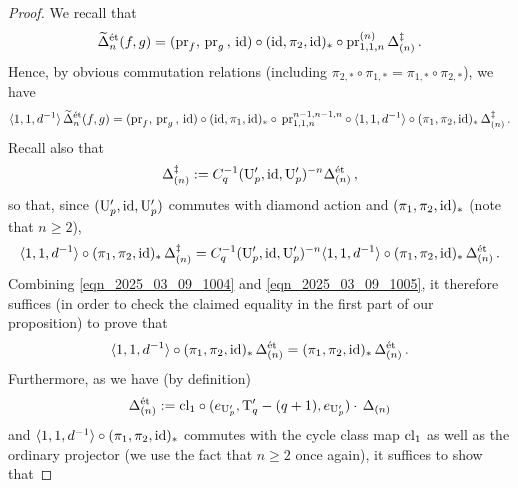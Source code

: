 \documentclass{amsart}
\numberwithin{equation}{section}
\newcommand{\etale}{\textup{\'et}}
\begin{document}
\begin{proof}
    We recall that 
$$\widetilde{\Delta}_{n}^{\etale}(f,g)=({\rm pr}_f,\,{\rm pr}_g\,,\,{\rm id})\circ ({\rm id},\pi_2,{\rm id})_*\circ {\rm pr}^{(n)}_{1,1,n}  \,\Delta_{(n)}^{\ddagger}\,.$$
Hence, by obvious commutation relations (including $\pi_{2,*}\circ \pi_{1,*}=\pi_{1,*}\circ\pi_{2,*}$), we have
\begin{align}
\label{eqn_2025_03_09_1004}
\begin{aligned}
    \langle 1,1,d^{-1}\rangle\,\widetilde{\Delta}_{n}^{\etale}(f,g) =({\rm pr}_f,\,{\rm pr}_g\,,\,{\rm id})\circ ({\rm id},\pi_1,{\rm id})_*\circ \,{\rm pr}^{n-1,n-1,n}_{1,1,n}\circ \langle 1,1,d^{-1}\rangle \circ (\pi_1,\pi_2,{\rm id})_*\,\Delta_{(n)}^{\ddagger}\,.
\end{aligned}
\end{align}
Recall also that 
$$\Delta_{(n)}^{\ddagger}:=C_q^{-1}(\mathrm{U}_{p}',{\rm id},\mathrm{U}_{p}')^{-n}\Delta_{(n)}^{\etale}\,,$$
so that, since $({\rm U}_p', {\rm id},{\rm U}_p')$ commutes with diamond action and $(\pi_1,\pi_2,{\rm id})_*$ (note that $n\geq 2$),
\begin{equation}
\label{eqn_2025_03_09_1005}
\langle 1,1,d^{-1}\rangle \circ (\pi_1,\pi_2,{\rm id})_* \,\Delta_{(n)}^{\ddagger}=C_q^{-1}(\mathrm{U}_{p}',{\rm id},\mathrm{U}_{p}')^{-n}\langle 1,1,d^{-1}\rangle  \circ (\pi_1,\pi_2,{\rm id})_*\,\Delta_{(n)}^{\etale}\,.
\end{equation}
Combining \eqref{eqn_2025_03_09_1004} and \eqref{eqn_2025_03_09_1005}, it therefore suffices (in order to check the claimed equality in the first part of our proposition) to prove that
\begin{equation}
\label{eqn_2025_03_22_1357}
     \langle 1,1,d^{-1}\rangle \circ (\pi_1,\pi_2,{\rm id})_*\,\Delta_{(n)}^{\etale}=(\pi_1,\pi_2,{\rm id})_*\,\Delta_{(n)}^{\etale}\,.
\end{equation}
Furthermore, as we have (by definition)
\begin{equation}
\label{eqn_2025_03_22_1414}
    \Delta_{(n)}^{\etale}:= 
{\rm cl}_1 \circ (e_{\mathrm{U}_{p}'}, \mathrm{T}_{q}'-(q+1), e_{\mathrm{U}_{p}'}) \cdot\,\Delta_{(n)} %
\end{equation}
and $\langle 1,1,d^{-1}\rangle \circ (\pi_1,\pi_2,{\rm id})_*$ commutes with the
cycle class map ${\rm cl}_1$ as well as the ordinary projector (we use the fact that $n\geq 2$ once again), it suffices to show that

\end{proof}
\end{document}
